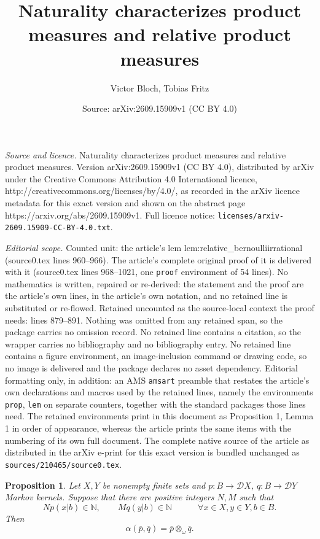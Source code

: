 \documentclass[10pt,a4paper]{amsart}
\title{Naturality characterizes product measures and relative product measures}
\author{Victor Bloch, Tobias Fritz}
\date{Source: arXiv:2609.15909v1 (CC BY 4.0)}
\newtheorem{prop}{Proposition}
\newcommand{\N}{\mathbb{N}}
\newcommand{\dist}{\mathcal{D}}
\begin{document}
\maketitle

\noindent\emph{Source and licence.} Naturality characterizes product measures and relative product measures. Version arXiv:2609.15909v1 (CC BY 4.0), distributed by arXiv under the Creative Commons Attribution 4.0 International licence, http://creativecommons.org/licenses/by/4.0/, as recorded in the arXiv licence metadata for this exact version and shown on the abstract page https://arxiv.org/abs/2609.15909v1. Full licence notice: \texttt{licenses/arxiv-2609.15909-CC-BY-4.0.txt}.\par\smallskip

\noindent\textit{Editorial scope.} Counted unit: the article's lem lem:relative\_bernoulliirrational (source0.tex lines 960--966). The article's complete original proof of it is delivered with it (source0.tex lines 968--1021, one \texttt{proof} environment of 54 lines). No mathematics is written, repaired or re-derived: the statement and the proof are the article's own lines, in the article's own notation, and no retained line is substituted or re-flowed.  Retained uncounted as the source-local context the proof needs: lines 879--891.  Nothing was omitted from any retained span, so the package carries no omission record.  No retained line contains a citation, so the wrapper carries no bibliography and no bibliography entry.  No retained line contains a figure environment, an image-inclusion command or drawing code, so no image is delivered and the package declares no asset dependency.  Editorial formatting only, in addition: an AMS \texttt{amsart} preamble that restates the article's own declarations and macros used by the retained lines, namely the environments \texttt{prop}, \texttt{lem} on separate counters, together with the standard packages those lines need.  The retained environments print in this document as Proposition 1, Lemma 1 in order of appearance, whereas the article prints the same items with the numbering of its own full document.  The complete native source of the article as distributed in the arXiv e-print for this exact version is bundled unchanged as \texttt{sources/210465/source0.tex}.
\begin{prop}\label{prop:relative_rationalcase}
	Let $X,Y$ be nonempty finite sets and $p : B \to \dist X$, $q : B \to \dist Y$ Markov kernels.
	Suppose that there are positive integers $N,M$ such that
	\[
		Np(x|b) \in \N, \qquad Mq(y|b) \in \N
		\qquad\quad
		\forall x \in X, y \in Y, b \in B.
	\]
	Then
	\[
		\alpha(\overline{p},\overline{q}) = \overline{p} \otimes_\omega \overline{q}.
	\]
\end{prop}
\end{document}
